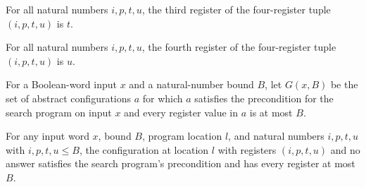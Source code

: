 \begin{lemma}
\label{Complexity.LogProg.WidthExample.rf_2}
\leanok
{}
For all natural numbers $i,p,t,u$, the third register of the four-register tuple
$(i,p,t,u)$ is $t$.
\end{lemma}

\begin{lemma}
\label{Complexity.LogProg.WidthExample.rf_3}
\leanok
{}
For all natural numbers $i,p,t,u$, the fourth register of the four-register tuple
$(i,p,t,u)$ is $u$.
\end{lemma}

\begin{definition}
\label{Complexity.LogProg.WidthExample.G}
\leanok
{}
For a Boolean-word input $x$ and a natural-number bound $B$, let $G(x,B)$ be the set of
abstract configurations $a$ for which $a$ satisfies the precondition for the search
program on input $x$ and every register value in $a$ is at most $B$.
\end{definition}

\begin{lemma}
\label{Complexity.LogProg.WidthExample.guard_rf}
\leanok
{}
For any input word $x$, bound $B$, program location $l$, and natural numbers $i,p,t,u$
with $i,p,t,u\le B$, the configuration at location $l$ with registers $(i,p,t,u)$ and no
answer satisfies the search program's precondition and has every register at most $B$.
\end{lemma}

